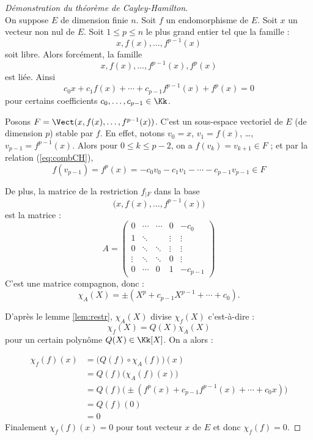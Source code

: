 \documentclass[12pt, class=report,crop=false]{standalone}
\begin{document}
\begin{proof}[Démonstration du théorème de Cayley-Hamilton]~\\
On suppose $E$ de dimension finie $n$.
Soit $f$ un endomorphisme de $E$. Soit $x$ un vecteur non nul de $E$. 
Soit $1 \le p \le n$ le plus grand entier tel que la famille :
\[x, f(x),\ldots,f^{p-1}(x)\]
soit libre. Alors forcément, la famille 
\[x, f(x),\ldots,f^{p-1}(x),f^{p}(x)\]
est liée.  Ainsi  
\begin{equation}
\label{eq:combCH}
c_0x + c_1 f(x) + \cdots +c_{p-1}f^{p-1}(x) + f^p(x) =0
\end{equation}
pour certains coefficients $c_0,\ldots, c_{p-1}\in \Kk$.

Posons $F  = \Vect( x, f(x),\ldots,f^{p-1}(x) )$. 
C'est un sous-espace vectoriel de $E$ (de dimension $p$) stable par $f$. 
En effet, notons $v_0 = x$, $v_1 = f(x)$, \ldots, $v_{p-1} = f^{p-1}(x)$.
Alors pour $0 \le k \le p-2$, on a $f(v_k) = v_{k+1} \in F$ ;
et par la relation (\ref{eq:combCH}), 
$$f(v_{p-1}) = f^p(x) = -c_0 v_0 - c_1v_1 - \cdots - c_{p-1}v_{p-1} \in F$$

De plus, la matrice de la restriction $f_{|F}$ dans la base 
\[\big(x, f(x),\ldots,f^{p-1}(x)\big)\]
est la matrice :
\[A = 
\begin{pmatrix}
0&\cdots&\cdots&0&-c_{0}\\
1&\ddots&&\vdots&\vdots\\
0&\ddots&\ddots&\vdots&\vdots\\
\vdots&\ddots&\ddots&0&\vdots\\
0&\cdots&0&1&-c_{p-1}
\end{pmatrix}\]
C'est une matrice compagnon, donc :
\[\chi_A(X)= \pm(X^p + c_{p-1}X^{p-1}+\cdots+c_0) .\]


D'après le lemme \ref{lem:restr}, $\chi_A(X)$ divise $\chi_f(X)$ c'est-à-dire :
\[\chi_f(X)= Q(X)\chi_A(X)\]
pour un certain polynôme $Q(X) \in \Kk[X]$. On a alors :

\begin{align*}
\chi_f(f)(x)
  &= \big(Q(f) \circ \chi_A(f)\big) (x) \\
  &= Q(f) \big( \chi_A(f) (x) \big) \\
  &= Q(f) \big( \pm(f^p(x)+c_{p-1}f^{p-1}(x)+\cdots+c_0x)\big) \\
  &= Q(f)(0) \\
  &= 0
\end{align*}
Finalement $\chi_f(f)(x)=0$ pour tout vecteur $x$ de $E$ et donc $\chi_f(f)=0$.
\end{proof}
\end{document}
